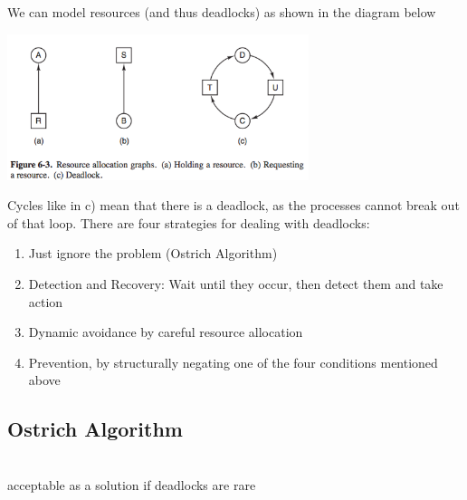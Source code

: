 \documentclass{article}
\begin{document}
We can model resources (and thus deadlocks) as shown in the diagram below
\begin{center}
\includegraphics[width= 250pt]{tex/ch6/6-3.png}
\end{center}
Cycles like in c) mean that there is a deadlock, as the processes cannot break out of that loop.
There are four strategies for dealing with deadlocks:
\begin{enumerate}
	\item Just ignore the problem (Ostrich Algorithm)
	\item Detection and Recovery: Wait until they occur, then detect them and take action
	\item Dynamic avoidance by careful resource allocation
	\item Prevention, by structurally negating one of the four conditions mentioned above
\end{enumerate}
\subsection*{Ostrich Algorithm}
\\acceptable as a solution if deadlocks are rare
\end{document}

